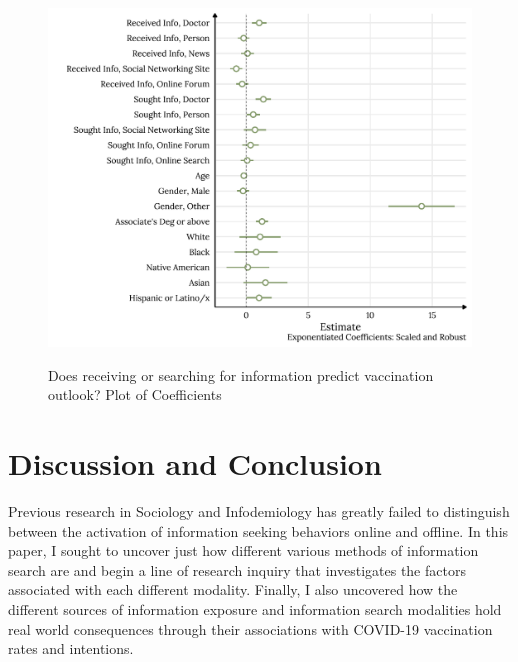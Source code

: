 \begin{figure}[h]
{\centering \includegraphics[width=0.8\linewidth]{figs/paper2/plot-model-3-1}}
\caption{Does receiving or searching for information predict vaccination outlook? Plot of Coefficients}\label{fig:plot-model-3}
\end{figure}

\hypertarget{discussion}{%
\section{Discussion and Conclusion}\label{discussion}}

Previous research in Sociology and Infodemiology has greatly failed to
distinguish between the activation of information seeking behaviors online and
offline. In this paper, I sought to uncover just how different various methods
of information search are and begin a line of research inquiry that investigates
the factors associated with each different modality. Finally, I also uncovered
how the different sources of information exposure and information search
modalities hold real world consequences through their associations with COVID-19
vaccination rates and intentions.


